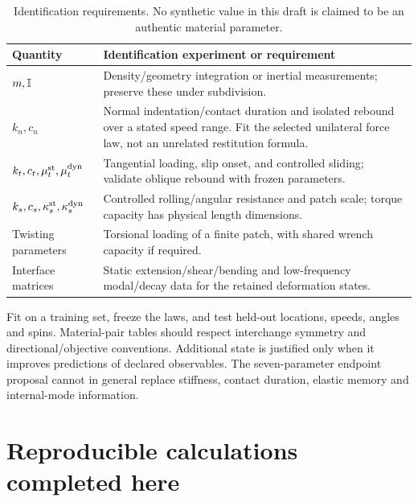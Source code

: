 \documentclass[11pt,a4paper]{article}
\begin{document}
\begin{table}[ht]\centering\small
\begin{tabular}{@{}p{.24\linewidth}p{.65\linewidth}@{}}\toprule
Quantity & Identification experiment or requirement\\\midrule
$m,\mathbb I$ & Density/geometry integration or inertial measurements; preserve these under subdivision.\\
$k_n,c_n$ & Normal indentation/contact duration and isolated rebound over a stated speed range. Fit the selected unilateral force law, not an unrelated restitution formula.\\
$k_t,c_t,\mu_t^{\rm st},\mu_t^{\rm dyn}$ & Tangential loading, slip onset, and controlled sliding; validate oblique rebound with frozen parameters.\\
$k_s,c_s,\kappa_s^{\rm st},\kappa_s^{\rm dyn}$ & Controlled rolling/angular resistance and patch scale; torque capacity has physical length dimensions.\\
Twisting parameters & Torsional loading of a finite patch, with shared wrench capacity if required.\\
Interface matrices & Static extension/shear/bending and low-frequency modal/decay data for the retained deformation states.\\\bottomrule
\end{tabular}
\caption{Identification requirements. No synthetic value in this draft is claimed to be an authentic material parameter.}
\end{table}

Fit on a training set, freeze the laws, and test held-out locations, speeds, angles and spins. Material-pair tables should respect interchange symmetry and directional/objective conventions. Additional state is justified only when it improves predictions of declared observables. The seven-parameter endpoint proposal cannot in general replace stiffness, contact duration, elastic memory and internal-mode information.

\section{Reproducible calculations completed here}
\end{document}
